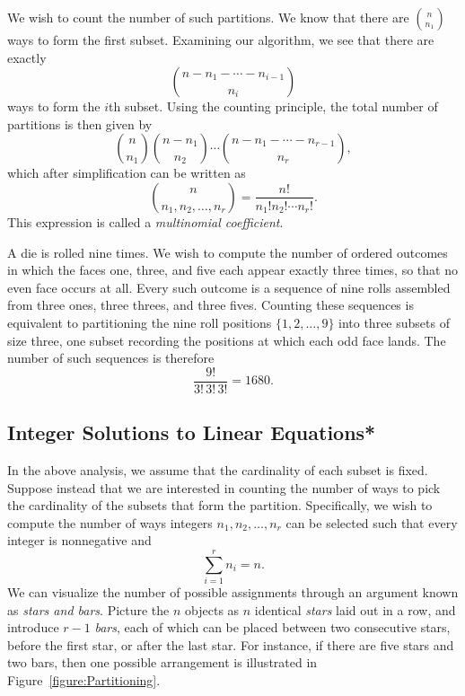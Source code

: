 We wish to count the number of such partitions.
We know that there are $\binom{n}{n_1}$ ways to form the first subset.
Examining our algorithm, we see that there are exactly
\begin{equation*}
\binom{n - n_1 - \cdots - n_{i-1}}{n_i}
\end{equation*}
ways to form the $i$th subset.
Using the counting principle, the total number of partitions is then given by
\begin{equation*}
\binom{n}{n_1} \binom{n - n_1}{n_2}
\cdots \binom{n - n_1 - \cdots - n_{r-1}}{n_r},
\end{equation*}
which after simplification can be written as
\begin{equation*}
\binom{n}{n_1, n_2, \ldots, n_r}
= \frac{n!}{n_1! n_2! \cdots n_r!} .
\end{equation*}
This expression is called a \emph{multinomial coefficient}. 

\begin{example}
A die is rolled nine times.
We wish to compute the number of ordered outcomes in which the faces one, three, and five each appear exactly three times, so that no even face occurs at all.
Every such outcome is a sequence of nine rolls assembled from three ones, three threes, and three fives.
Counting these sequences is equivalent to partitioning the nine roll positions $\{ 1, 2, \ldots, 9 \}$ into three subsets of size three, one subset recording the positions at which each odd face lands.
The number of such sequences is therefore
\begin{equation*}
\frac{9!}{3! \, 3! \, 3!} = 1680 .
\end{equation*}
\end{example}


\subsection{Integer Solutions to Linear Equations*}

In the above analysis, we assume that the cardinality of each subset is fixed.
Suppose instead that we are interested in counting the number of ways to pick the cardinality of the subsets that form the partition. 
Specifically, we wish to compute the number of ways integers $n_1, n_2, \ldots, n_r$ can be selected such that every integer is nonnegative and
\begin{equation*}
\sum_{i = 1}^r n_i = n.
\end{equation*}
We can visualize the number of possible assignments through an argument known as \emph{stars and bars}. 
Picture the $n$ objects as $n$ identical \emph{stars} laid out in a row, and introduce $r-1$ \emph{bars}, each of which can be placed between two consecutive stars, before the first star, or after the last star.
For instance, if there are five stars and two bars, then one possible arrangement is illustrated in Figure~\ref{figure:Partitioning}.

